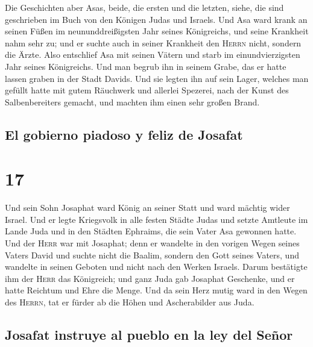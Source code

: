  Die Geschichten aber Asas, beide, die ersten und die
letzten, siehe, die sind geschrieben im Buch von den Königen Judas und
Israels.  Und Asa ward krank an seinen Füßen im
neununddreißigsten Jahr seines Königreichs, und seine Krankheit nahm
sehr zu; und er suchte auch in seiner Krankheit den \textsc{Herrn}
nicht, sondern die Ärzte.  Also entschlief Asa mit seinen
Vätern und starb im einundvierzigsten Jahr seines Königreichs.
 Und man begrub ihn in seinem Grabe, das er hatte lassen
graben in der Stadt Davids. Und sie legten ihn auf sein Lager, welches
man gefüllt hatte mit gutem Räuchwerk und allerlei Spezerei, nach der
Kunst des Salbenbereiters gemacht, und machten ihm einen sehr großen
Brand.

\hypertarget{el-gobierno-piadoso-y-feliz-de-josafat}{%
\subsection{El gobierno piadoso y feliz de
Josafat}\label{el-gobierno-piadoso-y-feliz-de-josafat}}

\hypertarget{section-16}{%
\section{17}\label{section-16}}

 Und sein Sohn Josaphat ward König an seiner Statt und
ward mächtig wider Israel.  Und er legte Kriegsvolk in
alle festen Städte Judas und setzte Amtleute im Lande Juda und in den
Städten Ephraims, die sein Vater Asa gewonnen hatte.  Und
der \textsc{Herr} war mit Josaphat; denn er wandelte in den vorigen
Wegen seines Vaters David und suchte nicht die Baalim, 
sondern den Gott seines Vaters, und wandelte in seinen Geboten und nicht
nach den Werken Israels.  Darum bestätigte ihm der
\textsc{Herr} das Königreich; und ganz Juda gab Josaphat Geschenke, und
er hatte Reichtum und Ehre die Menge.  Und da sein Herz
mutig ward in den Wegen des \textsc{Herrn}, tat er fürder ab die Höhen
und Ascherabilder aus Juda.

\hypertarget{josafat-instruye-al-pueblo-en-la-ley-del-seuxf1or}{%
\subsection{Josafat instruye al pueblo en la ley del
Señor}\label{josafat-instruye-al-pueblo-en-la-ley-del-seuxf1or}}

